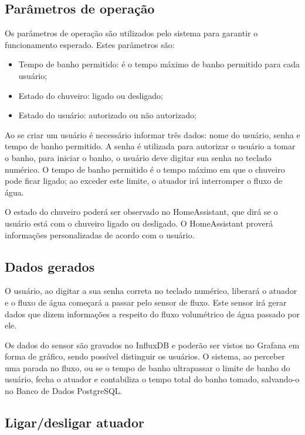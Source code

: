 \subsection{Parâmetros de operação}

Os parâmetros de operação são utilizados pelo sistema para garantir o funcionamento esperado. Estes parâmetros são:

\begin{itemize}
	\item Tempo de banho permitido: é o tempo máximo de banho permitido para cada usuário;
	\item Estado do chuveiro: ligado ou desligado;
	\item Estado do usuário: autorizado ou não autorizado;
\end{itemize}

Ao se criar um usuário é necessário informar três dados: nome do usuário, senha e tempo de banho permitido. A senha é utilizada para autorizar o usuário a tomar o banho, para iniciar o banho, o usuário deve digitar sua senha no teclado numérico. O tempo de banho permitido é o tempo máximo em que o chuveiro pode ficar ligado; ao exceder este limite, o atuador irá interromper o fluxo de água.

O estado do chuveiro poderá ser observado no HomeAssistant, que dirá se o usuário está com o chuveiro ligado ou desligado. O HomeAssistant proverá  informações personalizadas de acordo com o usuário.

\subsection{Dados gerados}

O usuário, ao digitar a sua senha correta no teclado numérico, liberará o atuador e o fluxo de água começará a passar pelo sensor de fluxo. Este sensor irá gerar dados que dizem informações a respeito do fluxo volumétrico de água passado por ele.

Os dados do sensor são gravados no InfluxDB e poderão ser vistos no Grafana em forma de gráfico, sendo possível distinguir os usuários. O sistema, ao perceber uma parada no fluxo, ou se o tempo de banho ultrapassar o limite de banho do usuário, fecha o atuador e contabiliza o tempo total do banho tomado, salvando-o no Banco de Dados PostgreSQL.

\subsection{Ligar/desligar atuador}

